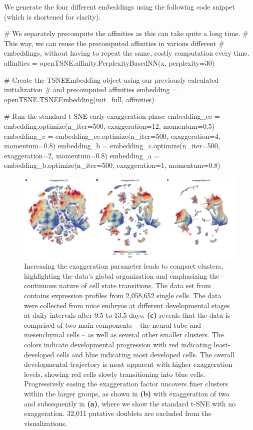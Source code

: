 \documentclass[article]{jss}
\begin{document}
We generate the four different embeddings using the following code snippet (which is shortened for clarity).
\begin{CodeChunk}
\begin{CodeInput}
# We separately precompute the affinities as this can take quite a long time.
# This way, we can reuse the precomputed affinities in various different
# embeddings, without having to repeat the same, costly computation every time.
affinities = openTSNE.affinity.PerplexityBasedNN(x, perplexity=30)

# Create the TSNEEmbedding object using our previously calculated initialization
# and precomputed affinities
embedding = openTSNE.TSNEEmbedding(init_full, affinities)

# Run the standard t-SNE early exaggeration phase
embedding_ee =    embedding.optimize(n_iter=500, exaggeration=12, momentum=0.5)
embedding_c  = embedding_ee.optimize(n_iter=500, exaggeration=4,  momentum=0.8)
embedding_b  =  embedding_c.optimize(n_iter=500, exaggeration=2,  momentum=0.8)
embedding_a  =  embedding_b.optimize(n_iter=500, exaggeration=1,  momentum=0.8)
\end{CodeInput}
\end{CodeChunk}

\begin{figure}[htbp]
  \includegraphics[width=\textwidth]{cao2019}
  \caption{\label{fig:cao}
  Increasing the exaggeration parameter leads to compact clusters, highlighting
  the data's global organization and emphasizing the continuous nature of
  cell state transitions. The data set from \citet{cao2019single}
  contains expression profiles from 2,058,652 single cells. The data were
  collected from mice embryos at different developmental stages at daily
  intervals after 9.5 to 13.5 days. \textbf{(c)} reveals that the data is
  comprised of two main components -- the neural tube and mesenchymal
  cells -- as well as several other smaller clusters. The
  colors indicate developmental progression with red indicating
  least-developed cells and blue indicating most developed cells. The
  overall developmental trajectory is most apparent with higher
  exaggeration levels, showing red cells slowly transitioning into blue
  cells. Progressively easing the exaggeration factor uncovers finer
  clusters within the larger groups, as shown in \textbf{(b)} with
  exaggeration of two and subsequently in \textbf{(a)}, where we show the
  standard t-SNE with no exaggeration. 32,011 putative doublets are
  excluded from the visualizations.
}
\end{figure}
\end{document}
